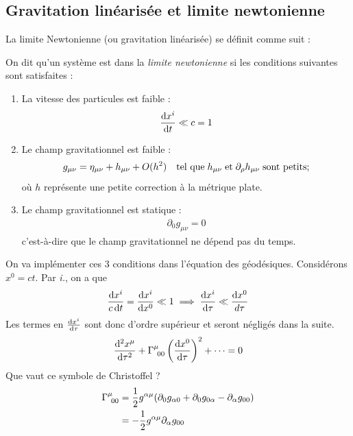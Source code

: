 \subsection{Gravitation linéarisée et limite newtonienne}
La limite Newtonienne (ou gravitation linéarisée) se définit comme suit :
\begin{theoremframe}
    \begin{defi} 
    \label{def:limite newtonienne}
    On dit qu'un système est dans la \emph{limite newtonienne} si les conditions suivantes sont satisfaites :
    \begin{enumerate}[label = \roman*.]
        \item La vitesse des particules est faible :
        \begin{align}
            \frac{\mathrm{d} x^{i}}{\mathrm{d} t} \ll c = 1
        \end{align}
        \item Le champ gravitationnel est faible :
        \begin{align}
            g_{\mu \nu} = \eta_{\mu \nu} + h_{\mu \nu} + O(h^2) \quad \text{tel que} \; h_{\mu\nu} \; \text{et}\; \partial_\rho h_{\mu\nu} \; \text{sont petits;}
        \end{align}
        où $h$ représente une petite correction à la métrique plate. 
        \item Le champ gravitationnel est statique :
        \begin{align}
            \partial_0 g_{\mu \nu} = 0
        \end{align} 
        c'est-à-dire que le champ gravitationnel ne dépend pas du temps.
    \end{enumerate}
    \end{defi}
\end{theoremframe}
On va implémenter ces 3 conditions dans l'équation des géodésiques. Considérons $x^0 = ct$. Par \emph{i.}, on a que 
\begin{align}
    \frac{\mathrm{d} x^{i}}{c\,\mathrm{d} t} = \frac{\mathrm{d} x^{i}}{\mathrm{d} x^0} \ll 1 \implies \frac{\mathrm{d} x^{i}}{\mathrm{d} \tau} \ll \frac{\mathrm{d} x^{0}}{d\tau}
\end{align}
Les termes en $\frac{\mathrm{d} x^{i}}{\mathrm{d} \tau}$ sont donc d'ordre supérieur et seront négligés dans la suite.
\begin{equation}
     \frac{\td ^2x^{\mu}}{\td \tau^2} + \Gamma\indices{^{\mu}_{\!0 0}}\left(\frac{\td x^{0}}{\td \tau}\right)^2 +\dots = 0
\end{equation}
Que vaut ce symbole de Christoffel ?
\begin{align}
    \Gamma\indices{^{\mu}_{\!0 0}} &= \frac{1}{2}g^{\alpha \mu}(\partial_0 g_{\alpha 0} + \partial_{0}g_{0\alpha} - \partial_{\alpha}g_{00})\\
    &= -\frac{1}{2}g^{\alpha \mu}\partial_{\alpha}g_{00}
\end{align}
